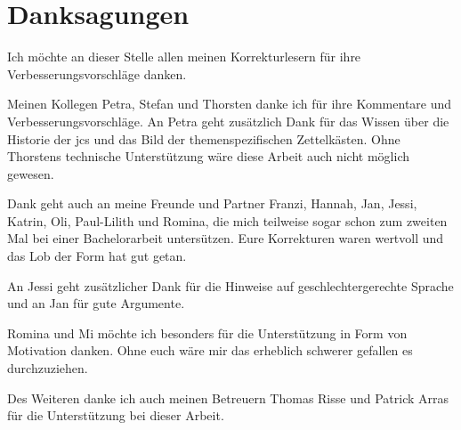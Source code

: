 \thispagestyle{empty}
\section*{Danksagungen}

Ich möchte an dieser Stelle allen meinen Korrekturlesern 
für ihre Verbesserungsvorschläge
danken.

Meinen Kollegen Petra, Stefan und Thorsten danke ich für ihre Kommentare und Verbesserungsvorschläge.
An Petra geht zusätzlich Dank für das Wissen über die Historie der \gls{jcs} 
und das Bild der themenspezifischen Zettelkästen.
Ohne Thorstens technische Unterstützung wäre diese Arbeit auch nicht möglich gewesen.

Dank geht auch an meine Freunde und Partner 
Franzi,
Hannah,
Jan,
Jessi,
Katrin,
Oli,
Paul-Lilith
und
Romina,
die mich teilweise sogar schon zum zweiten Mal bei einer Bachelorarbeit untersützen.
Eure Korrekturen waren wertvoll 
und das Lob der Form hat gut getan.

An Jessi geht zusätzlicher Dank für die Hinweise auf geschlechtergerechte Sprache
und an Jan für gute Argumente.

Romina und Mi möchte ich besonders für die Unterstützung in Form von Motivation danken.
Ohne euch wäre mir das erheblich schwerer gefallen es durchzuziehen.


Des Weiteren danke ich auch meinen Betreuern Thomas Risse und Patrick Arras 
für die Unterstützung bei dieser Arbeit.